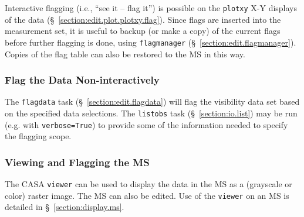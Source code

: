 Interactive flagging (i.e., ``see it -- flag it'') is possible on the
{\tt plotxy} X-Y displays of the data
(\S~\ref{section:edit.plot.plotxy.flag}).  Since flags are inserted into the
measurement set, it is useful to backup (or make a copy) of the
current flags before further flagging is done, using {\tt flagmanager}
(\S~\ref{section:edit.flagmanager}).  Copies of the flag table can
also be restored to the MS in this way.


\subsubsection{Flag the Data Non-interactively}
\label{section:intro.walkthru.flag.flag}

The {\tt flagdata} task (\S~\ref{section:edit.flagdata})
will flag the visibility data set based on the specified data
selections.  The {\tt listobs} task (\S~\ref{section:io.list}) may be
run (e.g. with {\tt verbose=True}) to provide some of the information
needed to specify the flagging scope. 
 
\subsubsection{Viewing and Flagging the MS}
\label{section:intro.walkthru.flag.viewer}

The CASA {\tt viewer} can be used to display the data in the MS
as a (grayscale or color) raster image.  The MS can also be edited.
Use of the {\tt viewer} on an MS is detailed in
\S~\ref{section:display.ms}.

